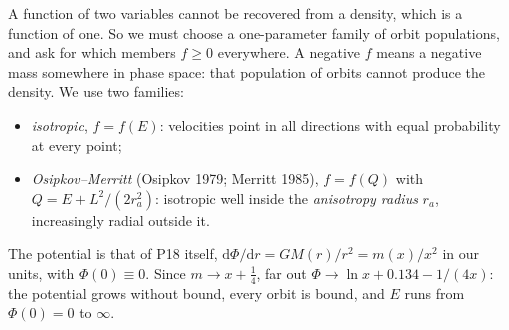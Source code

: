 \documentclass[11pt,a4paper]{article}
\newcommand{\dd}{\mathrm{d}}
\begin{document}
A function of two variables cannot be recovered from a density, which is a function
of one. So we must choose a one-parameter family of orbit populations, and ask for
which members $f\ge0$ everywhere. A negative $f$ means a negative mass somewhere in
phase space: that population of orbits cannot produce the density. We use two
families:
\begin{itemize}
\item \emph{isotropic}, $f=f(E)$: velocities point in all directions with equal
  probability at every point;
\item \emph{Osipkov--Merritt} (Osipkov 1979; Merritt 1985), $f=f(Q)$ with
  $Q=E+L^2/(2r_a^2)$: isotropic well inside the \emph{anisotropy radius} $r_a$,
  increasingly radial outside it.
\end{itemize}
The potential is that of P18 itself, $\dd\Phi/\dd r=GM(r)/r^2=m(x)/x^2$ in our
units, with $\Phi(0)\equiv0$. Since $m\to x+\tfrac14$, far out
$\Phi\to\ln x+0.134-1/(4x)$: the potential grows without bound, every orbit is
bound, and $E$ runs from $\Phi(0)=0$ to $\infty$.
\end{document}
